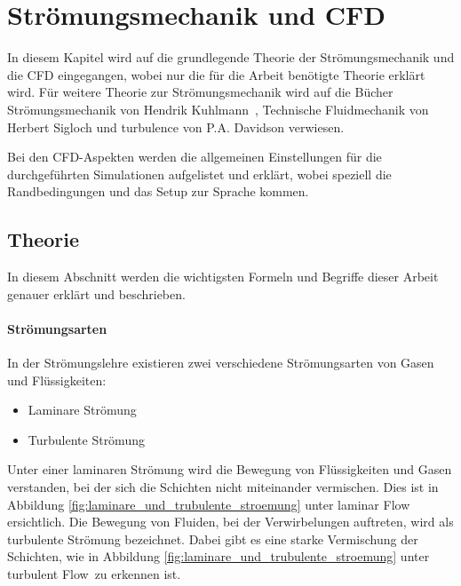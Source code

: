 \section{Strömungsmechanik und CFD}
\label{sec:stroemungsmechanik_und_cfd}
In diesem Kapitel wird auf die grundlegende Theorie der
Strömungsmechanik und die CFD eingegangen, wobei nur die für die
Arbeit benötigte Theorie erklärt wird. Für weitere Theorie zur
Strömungsmechanik wird auf die Bücher \guillemotleft{}Strömungsmechanik\guillemotright{} von Hendrik
Kuhlmann~\cite{Backus67}, \guillemotleft{}Technische Fluidmechanik\guillemotright{} von Herbert Sigloch
\cite{Backus66} und \guillemotleft{}turbulence\guillemotright{} von P.A. Davidson
\cite{Bay00} verwiesen.

 Bei
den CFD-Aspekten werden die allgemeinen Einstellungen für die
durchgeführten Simulationen aufgelistet und erklärt, wobei speziell
die Randbedingungen und das Setup zur Sprache kommen.


\subsection{Theorie}
\label{subsec:theorie}
In diesem Abschnitt werden die wichtigsten Formeln und Begriffe dieser Arbeit genauer erklärt und beschrieben.

\paragraph{Strömungsarten} 
\label{para:stroemungsarten}
$\;$\\
In der Strömungslehre existieren zwei verschiedene Strömungsarten von Gasen und Flüssigkeiten:

        \begin{itemize}
        \item Laminare Strömung
        \item Turbulente Strömung
        \end{itemize}

Unter einer laminaren Strömung wird die Bewegung von Flüssigkeiten und Gasen verstanden, bei der sich die Schichten nicht miteinander vermischen. Dies ist in Abbildung \ref{fig:laminare_und_trubulente_stroemung} unter \flqq laminar Flow\frqq \, ersichtlich.
Die Bewegung von Fluiden, bei der Verwirbelungen auftreten, wird als turbulente Strömung bezeichnet. Dabei gibt es eine starke Vermischung der Schichten, wie in Abbildung \ref{fig:laminare_und_trubulente_stroemung} unter \flqq turbulent Flow\frqq \, zu erkennen ist.

